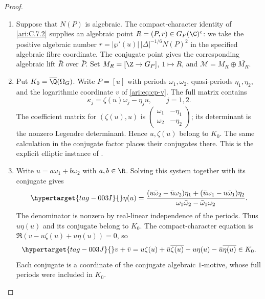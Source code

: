 \begin{proof}
\begin{enumerate}[label=\arabic*.,leftmargin=*]
\item Suppose that $N(P)$ is algebraic. The compact-character
identity of \cref{ari:C.7.2} supplies an algebraic point
$R=(P,r)\in G_P(\C)^c$: we take the positive algebraic number
$r=|\wp'(u)|\,|\Delta|^{-1/6}N(P)^2$ in the specified
algebraic fibre coordinate. The conjugate point gives the
corresponding algebraic lift $\bar R$ over $\bar P$.
Set $M_R=[\Z\to G_P]$, $1\mapsto R$, and
$\mathcal M=M_R\oplus\overline{M_R}$.

\item Put $K_0=\overline\Q(\Omega_G)$. Write
$P=[u]$ with periods $\omega_1,\omega_2$, quasi-periods
$\eta_1,\eta_2$, and the logarithmic coordinate $v$ of
\eqref{ari:eq:cp-v}. The full matrix contains
\[
 \kappa_j=\zeta(u)\omega_j-\eta_j u,\qquad j=1,2.
\]
The coefficient matrix for $(\zeta(u),u)$ is
$\left(\begin{smallmatrix}\omega_1&-\eta_1\\
\omega_2&-\eta_2\end{smallmatrix}\right)$; its determinant
is the nonzero Legendre determinant. Hence $u,\zeta(u)$
belong to $K_0$. The same calculation in the conjugate factor
places their conjugates there. This is the explicit elliptic
instance of \cite[Remark~4.13, p.~20]{bertolin2022}.

\item Write $u=a\omega_1+b\omega_2$ with $a,b\in\R$.
Solving this system together with its conjugate gives
\begin{equation}\hypertarget{tag-003I}{}\label{ari:eq:cp-real-linear}
 \eta(u)=
 \frac{(u\bar\omega_2-\bar u\omega_2)\eta_1
       +(\bar u\omega_1-u\bar\omega_1)\eta_2}
      {\omega_1\bar\omega_2-\bar\omega_1\omega_2}.
\end{equation}
The denominator is nonzero by real-linear independence of the
periods. Thus $u\eta(u)$ and its conjugate belong to $K_0$.
The compact-character equation is
$\Re(v-u\zeta(u)+u\eta(u))=0$, so
\begin{equation}\hypertarget{tag-003J}{}\label{ari:eq:cp-relation}
 v+\bar v=u\zeta(u)+\bar u\overline{\zeta(u)}
                -u\eta(u)-\bar u\overline{\eta(u)}\in K_0.
\end{equation}
Each conjugate is a coordinate of the conjugate algebraic
$1$-motive, whose full periods were included in $K_0$.


\end{enumerate}
\end{proof}
